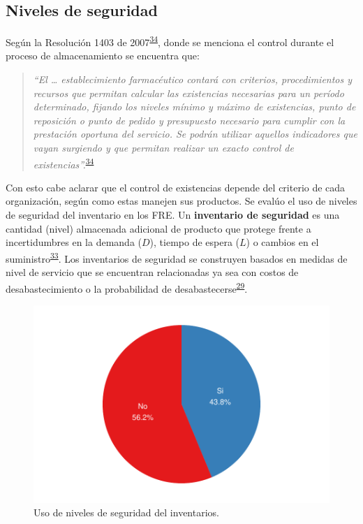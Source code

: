 \documentclass[
]{book}
\begin{document}
\hypertarget{niveles-de-seguridad}{%
\subsection{Niveles de seguridad}\label{niveles-de-seguridad}}

Según la Resolución 1403 de 2007\textsuperscript{\protect\hyperlink{ref-MinisteriodeSaludyProteccionSocial2007}{34}}, donde se menciona el control durante el proceso de almacenamiento se encuentra que:

\begin{quote}
\emph{``El \ldots{} establecimiento farmacéutico contará con criterios, procedimientos y recursos que permitan calcular las existencias necesarias para un período determinado, fijando los niveles mínimo y máximo de existencias, punto de reposición o punto de pedido y presupuesto necesario para cumplir con la prestación oportuna del servicio. Se podrán utilizar aquellos indicadores que vayan surgiendo y que permitan realizar un exacto control de existencias''.}\textsuperscript{\protect\hyperlink{ref-MinisteriodeSaludyProteccionSocial2007}{34}}
\end{quote}

Con esto cabe aclarar que el control de existencias depende del criterio de cada organización, según como estas manejen sus productos. Se evalúo el uso de niveles de seguridad del inventario en los FRE. Un \textbf{inventario de seguridad} es una cantidad (nivel) almacenada adicional de producto que protege frente a incertidumbres en la demanda (\(D\)), tiempo de espera (\(L\)) o cambios en el suministro\textsuperscript{\protect\hyperlink{ref-Krajewski2016}{33}}. Los inventarios de seguridad se construyen basados en medidas de nivel de servicio que se encuentran relacionadas ya sea con costos de desabastecimiento o la probabilidad de desabastecerse\textsuperscript{\protect\hyperlink{ref-Silver2017}{29}}.

\begin{figure}

{\centering \includegraphics[width=0.78\linewidth]{InformeFinal_files/figure-latex/UsoNivelesSeguridad-1} 

}

\caption{Uso de niveles de seguridad del inventarios.}\label{fig:UsoNivelesSeguridad}
\end{figure}
\end{document}
